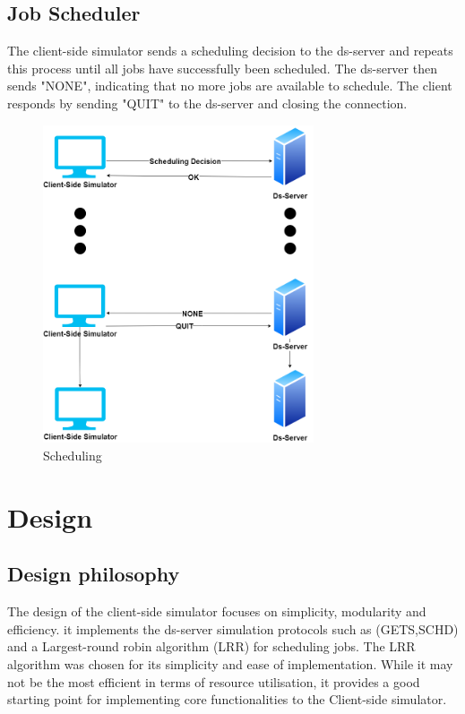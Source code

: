 \documentclass[a4paper]{article} %
\begin{document}
\subsection{Job Scheduler}
The client-side simulator sends a scheduling decision to the ds-server and repeats this process until all jobs have successfully been scheduled. The ds-server then sends "NONE", indicating that no more jobs are available to schedule. The client responds by sending "QUIT" to the ds-server and closing the connection.
\begin{figure}[!htb]
    \centering
    \includegraphics[width = 80mm ,scale=0.5]{Scheduling.png}
    \caption{Scheduling}
    \label{Scheduling}
\end{figure}

\label{sec:section2}

\section{Design}
\subsection{Design philosophy}
\label{sec:section3}
The design of the client-side simulator focuses on simplicity, modularity and efficiency. it implements the ds-server simulation protocols such as (GETS,SCHD) and a Largest-round robin algorithm (LRR) for scheduling jobs. The LRR algorithm was chosen for its simplicity and ease of implementation. While it may not be the most efficient in terms of resource utilisation, it provides a good starting point for implementing core functionalities to the Client-side simulator.    
\end{document}
